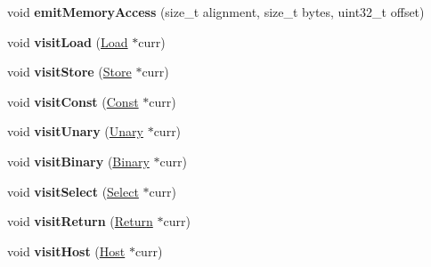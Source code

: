 \begin{DoxyCompactItemize}
\mbox{\label{classwasm_1_1_wasm_binary_writer_abd091246881fa688a129f275e850c82e}} 
void {\bfseries emit\+Memory\+Access} (size\+\_\+t alignment, size\+\_\+t bytes, uint32\+\_\+t offset)
\item 
\mbox{\label{classwasm_1_1_wasm_binary_writer_a0b26a365b0a46e503b3d62a243b6e281}} 
void {\bfseries visit\+Load} (\mbox{\hyperlink{classwasm_1_1_load}{Load}} $\ast$curr)
\item 
\mbox{\label{classwasm_1_1_wasm_binary_writer_a417b657618a97e483e667ad524b3fdae}} 
void {\bfseries visit\+Store} (\mbox{\hyperlink{classwasm_1_1_store}{Store}} $\ast$curr)
\item 
\mbox{\label{classwasm_1_1_wasm_binary_writer_a3200943933058e9b2a4541955e7c93f3}} 
void {\bfseries visit\+Const} (\mbox{\hyperlink{classwasm_1_1_const}{Const}} $\ast$curr)
\item 
\mbox{\label{classwasm_1_1_wasm_binary_writer_afec44647b9669f3cf3576055000a4a38}} 
void {\bfseries visit\+Unary} (\mbox{\hyperlink{classwasm_1_1_unary}{Unary}} $\ast$curr)
\item 
\mbox{\label{classwasm_1_1_wasm_binary_writer_aa91b7893c1321fd7094fbf775f7039fe}} 
void {\bfseries visit\+Binary} (\mbox{\hyperlink{classwasm_1_1_binary}{Binary}} $\ast$curr)
\item 
\mbox{\label{classwasm_1_1_wasm_binary_writer_a36ca69d0fdfaddea14d83696950db016}} 
void {\bfseries visit\+Select} (\mbox{\hyperlink{classwasm_1_1_select}{Select}} $\ast$curr)
\item 
\mbox{\label{classwasm_1_1_wasm_binary_writer_a1b371eb2188a8d5fc799c47158f52e3b}} 
void {\bfseries visit\+Return} (\mbox{\hyperlink{classwasm_1_1_return}{Return}} $\ast$curr)
\item 
\mbox{\label{classwasm_1_1_wasm_binary_writer_aa83d3a442650571f36eaf2c59c207c09}} 
void {\bfseries visit\+Host} (\mbox{\hyperlink{classwasm_1_1_host}{Host}} $\ast$curr)

\end{DoxyCompactItemize}
